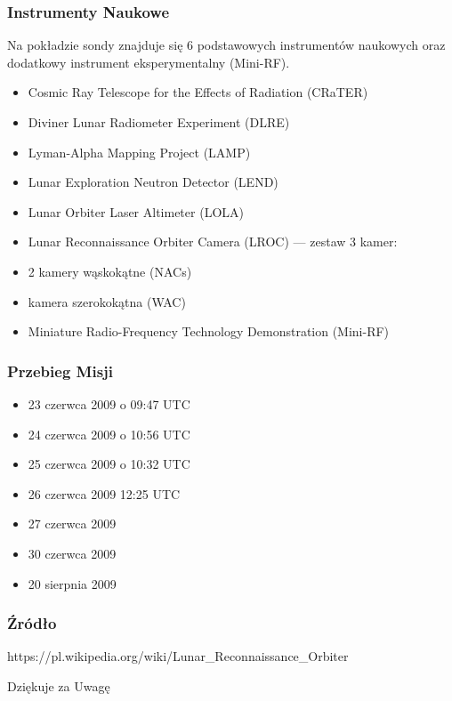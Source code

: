 \documentclass[]{beamer}
\begin{document}
\frame
{
\frametitle{Instrumenty Naukowe}
Na pokładzie sondy znajduje się 6 podstawowych instrumentów naukowych oraz dodatkowy instrument eksperymentalny (Mini-RF).
\begin{itemize}
\item Cosmic Ray Telescope for the Effects of Radiation (CRaTER) 
\item Diviner Lunar Radiometer Experiment (DLRE) 
\item Lyman-Alpha Mapping Project (LAMP) 
\item Lunar Exploration Neutron Detector (LEND)
\item Lunar Orbiter Laser Altimeter (LOLA) 
\item Lunar Reconnaissance Orbiter Camera (LROC) — zestaw 3 kamer:
\item 2 kamery wąskokątne (NACs) 
\item kamera szerokokątna (WAC) 
\item Miniature Radio-Frequency Technology Demonstration (Mini-RF)
\end{itemize}
}
\frame
{
\frametitle{Przebieg Misji}
\begin{itemize}
\item 23 czerwca 2009 o 09:47 UTC
\item 24 czerwca 2009 o 10:56 UTC
\item 25 czerwca 2009 o 10:32 UTC
\item 26 czerwca 2009 12:25 UTC
\item 27 czerwca 2009
\item 30 czerwca 2009
\item 20 sierpnia 2009
\end{itemize}
}
\frame
{
\frametitle{Źródło}
https://pl.wikipedia.org/wiki/Lunar\_Reconnaissance\_Orbiter
}
\frame
{
\begin{center}
Dziękuje za Uwagę
\end{center} 
}
\end{document}
